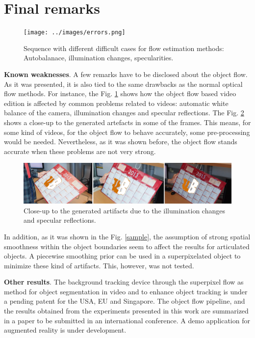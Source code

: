 \section{Final remarks} \label{sec:remarks}

   \begin{figure}[thpb]
      \centering
      \texttt{[image: ../images/errors.png]}
      \caption{ Sequence with different difficult cases for flow estimation methods: Autobalanace, illumination changes, specularities. }
      \label{of_errors}
   \end{figure}

\textbf{Known weaknesses}. A few remarks have to be disclosed about the object flow. As it was presented, it is also tied to the same drawbacks as the normal optical flow methods. 
For instance, the Fig. \ref{of_errors} shows how the object flow based video edition is affected by common problems related to videos: 
automatic white balance of the camera, illumination changes and specular reflections. The Fig. \ref{zoom_errors} shows a close-up to the generated 
artefacts in some of the frames. This means, for some kind of videos, for the object flow to behave accurately, some pre-processing would be needed. 
Nevertheless, as it was shown before, the object flow stands accurate when these problems are not very strong.

   \begin{figure}[thpb]
      \centering
      \includegraphics[width=1.00\textwidth]{../images/zoomerrors.png}
      \caption{Close-up to the generated artifacts due to the illumination changes and specular reflections. }
      \label{zoom_errors}
   \end{figure}

In addition, as it was shown in the Fig. \ref{sample}, the assumption of strong spatial smoothness within the object boundaries seem to affect the results 
for articulated objects. A piecewise smoothing prior can be used in a superpixelated object to minimize these kind of artifacts. This, however, was not tested.

\textbf{Other results}. The background tracking device through the superpixel flow as method 
for object segmentation in video and to enhance object tracking is under a pending patent for the USA, EU and Singapore.
The object flow pipeline, and the results obtained from the experiments 
presented in this work are summarized in a paper to be submitted in an international conference. 
A demo application for augmented reality is under development.

